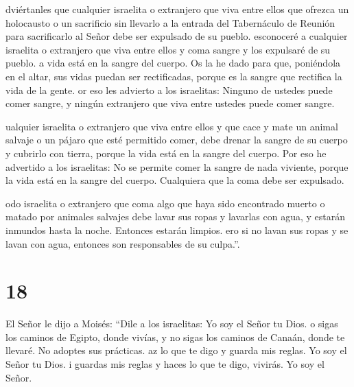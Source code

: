  dviértanles que cualquier israelita o extranjero que viva
entre ellos que ofrezca un holocausto o un sacrificio  sin
llevarlo a la entrada del Tabernáculo de Reunión para sacrificarlo al
Señor debe ser expulsado de su pueblo.  esconoceré a
cualquier israelita o extranjero que viva entre ellos y coma sangre y
los expulsaré de su pueblo.  a vida está en la sangre del
cuerpo. Os la he dado para que, poniéndola en el altar, sus vidas puedan
ser rectificadas, porque es la sangre que rectifica la vida de la gente.
 or eso les advierto a los israelitas: Ninguno de ustedes
puede comer sangre, y ningún extranjero que viva entre ustedes puede
comer sangre.

 ualquier israelita o extranjero que viva entre ellos y que
cace y mate un animal salvaje o un pájaro que esté permitido comer, debe
drenar la sangre de su cuerpo y cubrirlo con tierra, 
porque la vida está en la sangre del cuerpo. Por eso he advertido a los
israelitas: No se permite comer la sangre de nada viviente, porque la
vida está en la sangre del cuerpo. Cualquiera que la coma debe ser
expulsado.

 odo israelita o extranjero que coma algo que haya sido
encontrado muerto o matado por animales salvajes debe lavar sus ropas y
lavarlas con agua, y estarán inmundos hasta la noche. Entonces estarán
limpios.  ero si no lavan sus ropas y se lavan con agua,
entonces son responsables de su culpa.''.

\hypertarget{section-17}{%
\section{18}\label{section-17}}

 El Señor le dijo a Moisés:  ``Dile a los
israelitas: Yo soy el Señor tu Dios.  o sigas los caminos de
Egipto, donde vivías, y no sigas los caminos de Canaán, donde te
llevaré. No adoptes sus prácticas.  az lo que te digo y
guarda mis reglas. Yo soy el Señor tu Dios.  i guardas mis
reglas y haces lo que te digo, vivirás. Yo soy el Señor.

